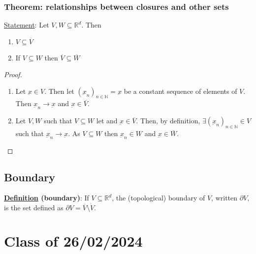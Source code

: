 \documentclass[10pt]{extarticle}
\newcommand{\R}{\mathbb{R}}
\newcommand{\N}{\mathbb{N}}
\newcommand{\munderbar}[1]{\underbar{\ensuremath{#1}}}
\newcommand{\skiplineafterproof}{$ $\par\nobreak\ignorespaces}
\begin{document}
                \subsubsection{Theorem: relationships between closures and other sets}

                \underline{Statement}: Let $V, W \subseteq \R^d$.
                Then

                \begin{enumerate}
                    \item $V \subseteq \overline{V}$
                    \item If $V \subseteq W$ then $\overline{V} \subseteq \overline{W}$
                \end{enumerate}

                \begin{proof}
                    \skiplineafterproof
                    \begin{enumerate}
                        \item Let $\munderbar{x} \in V$.
                              Then let $\left(\munderbar{x}_n\right)_{n \in \N} = \munderbar{x}$ be a constant sequence of elements of $V$.
                              Then $\munderbar{x}_n \to \munderbar{x}$ and $\munderbar{x} \in \overline{V}$.
                        \item Let $V, W$ such that $V \subseteq W$ let and $\munderbar{x} \in \overline{V}$.
                              Then, by definition, $\exists \left(\munderbar{x}_n\right)_{n \in \N} \in V$ such that $\munderbar{x}_n \to \munderbar{x}$.
                              As $V \subseteq W$ then $\munderbar{x}_n \in W$ and $\munderbar{x} \in \overline{W}$.
                    \end{enumerate}
                \end{proof}

                \subsection{Boundary}

                \textbf{\underline{Definition} (boundary)}:
                If $V \subseteq \R^d$, the (topological) boundary of $V$, written $\partial V$, is the set defined as $\partial V = \overline{V} \setminus \mathring{V}$.

                \section{Class of 26/02/2024}
\end{document}
